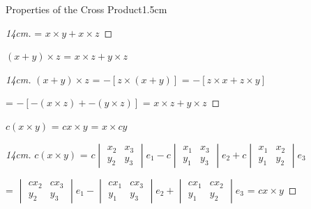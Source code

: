 \begin{ltheorem}{Properties of the Cross Product}{1.5cm}
\begin{proof}[14cm]
                \hspace{0.1cm}
                = $x \times y + x \times z$
            \end{proof}

            \newpage

        \item $(x + y) \times z$ = $x \times z + y \times z$
        
            \begin{proof}[14cm]
                $(x + y) \times z$
                = $-[z \times (x+y)]$
                = $-[z \times x + z \times y]$

                \hspace{2cm}
                = $-[-(x \times z) + -(y \times z)]$
                = $x \times z + y \times z$
            \end{proof}

        \item $c(x \times y)$ = $cx \times y$ = $x \times cy$
        
            \begin{proof}[14cm]
                $c(x \times y)$ =
                $c\begin{vmatrix}
                    x_2 & x_3 \\
                    y_2 & y_3 
                \end{vmatrix}e_1
                - c\begin{vmatrix}
                    x_1 & x_3 \\
                    y_1 & y_3 
                \end{vmatrix}e_2
                + c\begin{vmatrix}
                    x_1 & x_2 \\
                    y_1 & y_2 
                \end{vmatrix}e_3$

                \hspace{1.5cm}
                = $\begin{vmatrix}
                    cx_2 & cx_3 \\
                    y_2 & y_3 
                \end{vmatrix}e_1
                - \begin{vmatrix}
                    cx_1 & cx_3 \\
                    y_1 & y_3 
                \end{vmatrix}e_2
                + \begin{vmatrix}
                    cx_1 & cx_2 \\
                    y_1 & y_2 
                \end{vmatrix}e_3$
                = $cx \times y$


\end{proof}
\end{ltheorem}
